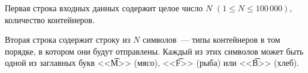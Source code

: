Первая строка входных данных содержит целое число $N$ $(1 \le N \le 100\,000)$, количество контейнеров.

Вторая строка содержит строку из $N$ символов~--- типы контейнеров в том порядке, в котором они будут
отправлены. Каждый из этих символов может быть одной из заглавных букв <<\t{M}>> (мясо), <<\t{F}>> (рыба) или <<\t{B}>> (хлеб). 